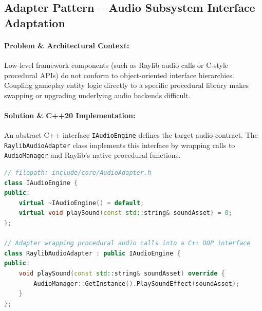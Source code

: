 \documentclass[12pt,a4paper]{article}
\begin{document}
\subsection{Adapter Pattern -- Audio Subsystem Interface Adaptation}

\paragraph{Problem \& Architectural Context:}
Low-level framework components (such as Raylib audio calls or C-style procedural APIs) do not conform to object-oriented interface hierarchies. Coupling gameplay entity logic directly to a specific procedural library makes swapping or upgrading underlying audio backends difficult.

\paragraph{Solution \& C++20 Implementation:}
An abstract C++ interface \texttt{IAudioEngine} defines the target audio contract. The \texttt{RaylibAudioAdapter} class implements this interface by wrapping calls to \texttt{AudioManager} and Raylib's native procedural functions.

\begin{center}
\end{center}

\begin{lstlisting}[language=C++, caption={Adapter Pattern -- RaylibAudioAdapter}]
// filepath: include/core/AudioAdapter.h
class IAudioEngine {
public:
    virtual ~IAudioEngine() = default;
    virtual void playSound(const std::string& soundAsset) = 0;
};

// Adapter wrapping procedural audio calls into a C++ OOP interface
class RaylibAudioAdapter : public IAudioEngine {
public:
    void playSound(const std::string& soundAsset) override {
        AudioManager::GetInstance().PlaySoundEffect(soundAsset);
    }
};
\end{lstlisting}
\end{document}
